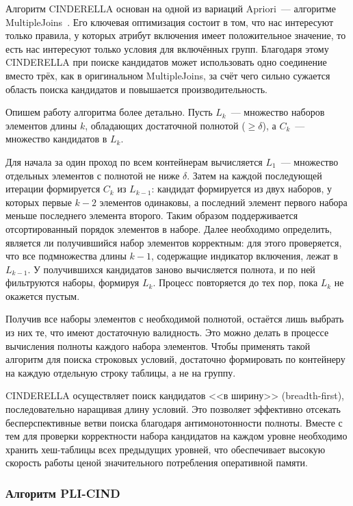 Алгоритм CINDERELLA основан на одной из вариаций Apriori~--- алгоритме MultipleJoins~\cite{brink2012cind}. Его ключевая оптимизация состоит в том, что нас интересуют только правила, у которых атрибут включения имеет положительное значение, то есть нас интересуют только условия для включённых групп. Благодаря этому CINDERELLA при поиске кандидатов может использовать одно соединение вместо трёх, как в оригинальном MultipleJoins, за счёт чего сильно сужается область поиска кандидатов и повышается производительность.

Опишем работу алгоритма более детально. Пусть $L_k$~--- множество наборов элементов длины $k$, обладающих достаточной полнотой ($\geq \delta$), а $C_k$~--- множество кандидатов в $L_k$.

Для начала за один проход по всем контейнерам вычисляется $L_1$~--- множество отдельных элементов с полнотой не ниже $\delta$. Затем на каждой последующей итерации формируется $C_k$ из $L_{k-1}$: кандидат формируется из двух наборов, у которых первые $k-2$ элементов одинаковы, а последний элемент первого набора меньше последнего элемента второго. Таким образом поддерживается отсортированный порядок элементов в наборе. Далее необходимо определить, является ли получившийся набор элементов корректным: для этого проверяется, что все подмножества длины $k-1$, содержащие индикатор включения, лежат в $L_{k-1}$. У получившихся кандидатов заново вычисляется полнота, и по ней фильтруются наборы, формируя $L_k$. Процесс повторяется до тех пор, пока $L_k$ не окажется пустым.

Получив все наборы элементов с необходимой полнотой, остаётся лишь выбрать из них те, что имеют достаточную валидность. Это можно делать в процессе вычисления полноты каждого набора элементов. Чтобы применять такой алгоритм для поиска строковых условий, достаточно формировать по контейнеру на каждую отдельную строку таблицы, а не на группу.

CINDERELLA осуществляет поиск кандидатов <<в ширину>> (breadth-first), последовательно наращивая длину условий. Это позволяет эффективно отсекать бесперспективные ветви поиска благодаря антимонотонности полноты. Вместе с тем для проверки корректности набора кандидатов на каждом уровне необходимо хранить хеш-таблицы всех предыдущих уровней, что обеспечивает высокую скорость работы ценой значительного потребления оперативной памяти.

\subsubsection{Алгоритм PLI-CIND}

